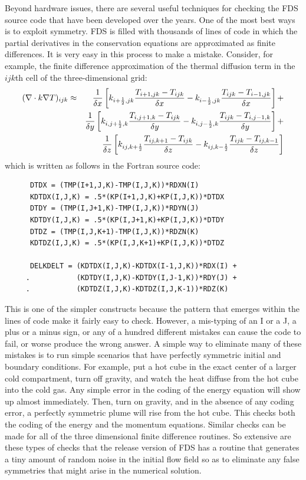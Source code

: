 \documentclass[11pt]{book}
\begin{document}
Beyond hardware issues, there are several useful techniques for
checking the FDS source code that have been developed over the
years. One of the most best ways is to exploit symmetry. FDS is filled
with thousands of lines of code in which the partial derivatives in
the conservation equations are approximated as finite differences. It
is very easy in this process to make a mistake. Consider, for example,
the finite difference approximation of the thermal diffusion term in
the $ijk$th cell of the three-dimensional grid:
\begin{eqnarray*}
(\nabla \cdot k \nabla T)_{ijk} &\approx&
              \frac{1}{\delta x}
         \left[k_{i+\frac{1}{2},jk}\frac{T_{i+1,jk}-T_{ijk}}{\delta x}
              -k_{i-\frac{1}{2},jk}\frac{T_{ijk}-T_{i-1,jk}}{\delta x}\right]+  \nonumber \\
            &&\frac{1}{\delta y}
         \left[k_{i,j+\frac{1}{2},k}\frac{T_{i,j+1,k}-T_{ijk}}{\delta y}
              -k_{i,j-\frac{1}{2},k}\frac{T_{ijk}-T_{i,j-1,k}}{\delta y}\right]+ \nonumber \\
            &&\frac{1}{\delta z}
         \left[k_{ij,k+\frac{1}{2}}\frac{T_{ij,k+1}-T_{ijk}}{\delta z}
              -k_{ij,k-\frac{1}{2}}\frac{T_{ijk}-T_{ij,k-1}}{\delta z}\right]
\end{eqnarray*}
which is written as follows in the Fortran source code:
\begin{verbatim}
      DTDX = (TMP(I+1,J,K)-TMP(I,J,K))*RDXN(I)
      KDTDX(I,J,K) = .5*(KP(I+1,J,K)+KP(I,J,K))*DTDX
      DTDY = (TMP(I,J+1,K)-TMP(I,J,K))*RDYN(J)
      KDTDY(I,J,K) = .5*(KP(I,J+1,K)+KP(I,J,K))*DTDY
      DTDZ = (TMP(I,J,K+1)-TMP(I,J,K))*RDZN(K)
      KDTDZ(I,J,K) = .5*(KP(I,J,K+1)+KP(I,J,K))*DTDZ

      DELKDELT = (KDTDX(I,J,K)-KDTDX(I-1,J,K))*RDX(I) +
     .           (KDTDY(I,J,K)-KDTDY(I,J-1,K))*RDY(J) +
     .           (KDTDZ(I,J,K)-KDTDZ(I,J,K-1))*RDZ(K)
\end{verbatim}
This is one of the simpler constructs because the pattern that emerges
within the lines of code make it fairly easy to check. However, a
mis-typing of an {\ct I} or a {\ct J}, a plus or a minus sign, or any
of a hundred different mistakes can cause the code to fail, or worse
produce the wrong answer. A simple way to eliminate many of these
mistakes is to run simple scenarios that have perfectly symmetric
initial and boundary conditions.  For example, put a hot cube in the
exact center of a larger cold compartment, turn off gravity, and watch
the heat diffuse from the hot cube into the cold gas. Any simple error
in the coding of the energy equation will show up almost
immediately. Then, turn on gravity, and in the absence of any coding
error, a perfectly symmetric plume will rise from the hot cube. This
checks both the coding of the energy and the momentum
equations. Similar checks can be made for all of the three dimensional
finite difference routines. So extensive are these types of checks
that the release version of FDS has a routine that generates a tiny
amount of random noise in the initial flow field so as to eliminate
any false symmetries that might arise in the numerical solution.
\end{document}
